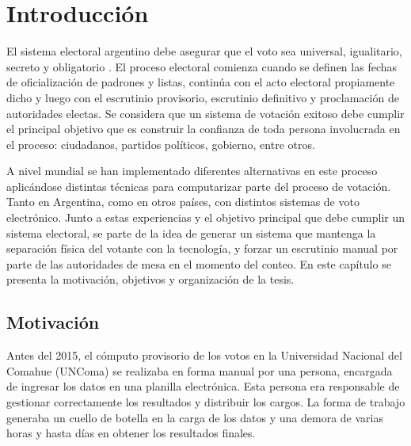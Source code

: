 \label{Introduccion}
\chapter{Introducción}
El sistema electoral argentino debe asegurar que el voto sea universal, igualitario, secreto y obligatorio \citep{arlettaz2012libertad}. El proceso electoral comienza cuando se definen las fechas de oficialización de padrones y listas, continúa con el acto electoral propiamente dicho y luego con el escrutinio provisorio, escrutinio definitivo y proclamación de autoridades electas. Se considera que un sistema de votación exitoso debe cumplir el principal objetivo que es construir la confianza de toda persona involucrada en el proceso: ciudadanos, partidos políticos, gobierno, entre otros. 

A nivel mundial se han implementado diferentes alternativas en este proceso aplicándose distintas técnicas para computarizar parte del proceso de votación. Tanto en Argentina, como en  otros  países,  con  distintos  sistemas  de  voto  electrónico. Junto a estas experiencias y el objetivo principal que debe cumplir un sistema electoral, se parte de la idea de generar un sistema que mantenga la separación física del votante con la tecnología, y forzar un escrutinio manual por parte de las autoridades de mesa en el momento del conteo. \newline
En este capítulo se presenta la motivación, objetivos y organización de la tesis.

\section{Motivación}
Antes del 2015, el cómputo provisorio de los votos en la Universidad Nacional del Comahue (UNComa) se realizaba en forma manual por una persona, encargada de ingresar los datos en una planilla electrónica. Esta persona era responsable de gestionar correctamente los resultados y distribuir los cargos. La forma de trabajo generaba un cuello de botella en la carga de los datos y una demora de varias horas y hasta días en obtener los resultados finales. \newline

